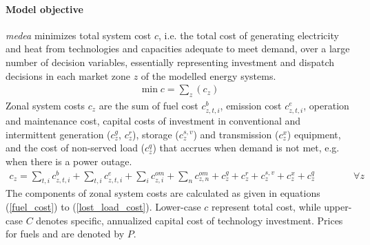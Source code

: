 \documentclass[11pt,a4paper]{article}
\begin{document}
\paragraph{Model objective}
\emph{medea} minimizes total system cost $c$, i.e. the total cost of generating electricity and heat from technologies and capacities adequate to meet demand, over a large number  of decision variables, essentially representing investment and dispatch decisions in each market zone $z$ of the modelled energy systems.
\begin{align}
\min c = \sum_{z} (c_{z})
\end{align}
Zonal system costs $c_{z}$ are the sum of fuel cost $c^{b}_{z,t,i}$, emission cost $c^{e}_{z,t,i}$, operation and maintenance cost, capital costs of investment in conventional and intermittent generation ($c^{g}_{z}$, $c^{r}_{z}$), storage ($c^{s,v}_{z}$) and transmission ($c^{x}_{z}$) equipment, and the cost of non-served load ($c^{q}_{z}$) that accrues when demand is not met, e.g. when there is a power outage. 
\begin{align}
c_{z} = \sum_{t,i}  c^{b}_{z,t,i} + \sum_{t,i} c^{e}_{z,t,i} + \sum_{i} c^{om}_{z,i} + \sum_{n} c^{om}_{z,n} + c^{g}_{z} + 
 c^{r}_{z} + c^{s,v}_{z} + c^{x}_{z} + c^{q}_{z} \qquad \qquad \forall z
\end{align}
The components of zonal system costs are calculated as given in equations (\ref{fuel_cost}) to (\ref{lost_load_cost}).
Lower-case $c$ represent total cost, while upper-case $C$ denotes specific, annualized capital cost of technology investment. Prices for fuels and  are denoted by $P$.
\end{document}
